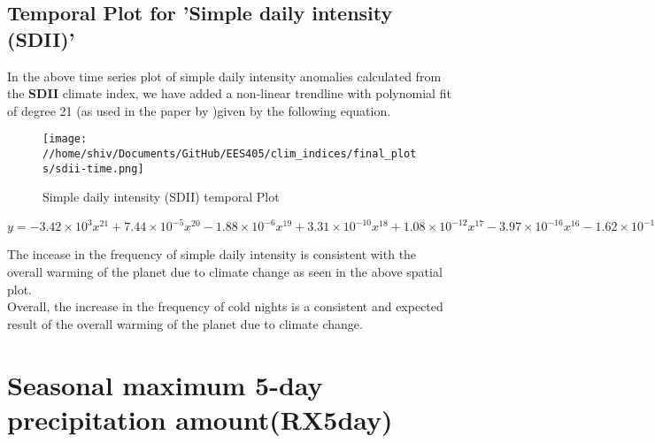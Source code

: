 \documentclass[a4paper, 12pt, twoside]{report}
\begin{document}
\subsection{Temporal Plot for 'Simple daily intensity (SDII)'}
In the above time series plot of simple daily intensity anomalies calculated from the \textbf{SDII} climate index, we have added a non-linear trendline with polynomial fit of degree 21 (as used in the paper by )given by the following equation.\\

\begin{figure}[htb]
    \centering
    \texttt{[image: //home/shiv/Documents/GitHub/EES405/clim\_indices/final\_plots/sdii-time.png]}
    \caption{Simple daily intensity (SDII) temporal Plot}
    \label{fig:sdii_temporal}
\end{figure}

$ y = -3.42\times10^{3}x^{21}+7.44\times10^{-5}x^{20}-1.88\times10^{-6}x^{19}+3.31\times10^{-10}x^{18}+1.08\times10^{-12}x^{17}-3.97\times10^{-16}x^{16}-1.62\times10^{-19}x^{15}+1.05\times10^{-22}x^{14}-5.80\times10^{-27}x^{13}-8.00\times10^{-30}x^{12}+2.29\times10^{-33}x^{11}-1.20\times10^{-37}x^{10}-6.72\times10^{-41}x^{9}+1.99\times10^{-44}x^{8}-2.95\times10^{-48}x^{7}+2.85\times10^{-52}x^{6}-1.92\times10^{-56}x^{5}+9.12\times10^{-61}x^{4}-3.03\times10^{-65}x^{3}+6.69\times10^{-70}x^{2}-8.87\times10^{-75}x+5.34\times10^{-80}$

The incease in the frequency of simple daily intensity is consistent with the overall warming of the planet due to climate change as seen in the above spatial plot.\\
Overall, the increase in the frequency of cold nights is a consistent and expected result of the overall warming of the planet due to climate change.

\section{Seasonal maximum 5-day precipitation amount(RX5day)}
\end{document}
